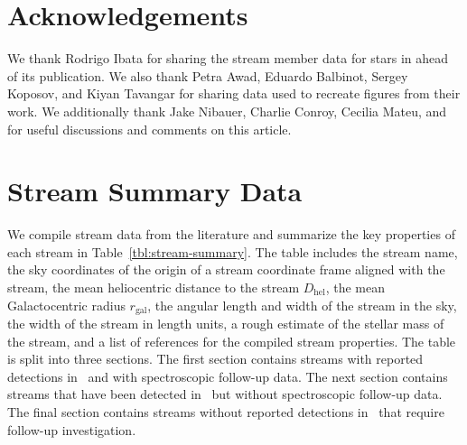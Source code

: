 \documentclass[final,5p,times,twocolumn,authoryear]{elsarticle}
\begin{document}


\section*{Acknowledgements}

We thank Rodrigo Ibata for sharing the stream member data for stars in
\citet{ibata:2023} ahead of its publication.
We also thank Petra Awad, Eduardo Balbinot, Sergey Koposov, and Kiyan Tavangar for
sharing data used to recreate figures from their work.
We additionally thank Jake Nibauer, Charlie Conroy, Cecilia Mateu, and 
for useful discussions and comments on this article.


\appendix

\section{Stream Summary Data}
\label{apx:stream-summary}

We compile stream data from the literature and summarize the key properties of each
stream in Table~\ref{tbl:stream-summary}.
The table includes the stream name, the sky coordinates of the origin of a stream
coordinate frame aligned with the stream, the mean heliocentric distance to the stream
$D_\textrm{hel}$, the mean Galactocentric radius $r_{\textrm{gal}}$, the angular length
and width of the stream in the sky, the width of the stream in length units, a rough
estimate of the stellar mass of the stream, and a list of references for the compiled
stream properties.
The table is split into three sections.
The first section contains streams with reported detections in \gaia\ and with
spectroscopic follow-up data.
The next section contains streams that have been detected in \gaia\ but without
spectroscopic follow-up data.
The final section contains streams without reported detections in \gaia\ that require
follow-up investigation.
\end{document}
